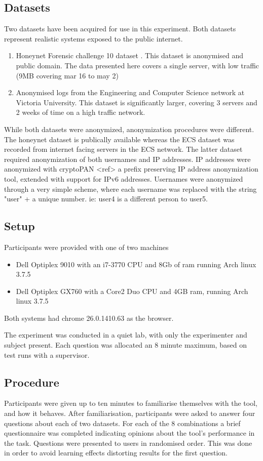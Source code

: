 \subsection{Datasets}\label{data}

Two datasets have been acquired for use in this experiment. Both datasets represent realistic systems exposed to the public internet. 
\begin{enumerate}
\item{Honeynet Forensic challenge 10 dataset \cite{forensic10}. This dataset is anonymised and public domain. The data presented here covers a single server, with low traffic (9MB covering mar 16 to may 2)}
\item{Anonymised logs from the Engineering and Computer Science network at Victoria University. This dataset is significantly larger, covering 3 servers and 2 weeks of time on a high traffic network. }
\end{enumerate}

While both datasets were anonymized, anonymization procedures were different. The honeynet dataset is publically available \cite{forensic10} whereas the ECS dataset was recorded from internet facing servers in the ECS network. The latter dataset required anonymization of both usernames and IP addresses.
IP addresses were anonymized with cryptoPAN <ref> a prefix preserving IP address anonymization tool, extended with support for IPv6 addresses. Usernames were anonymized through a very simple scheme, where each username was replaced with the string "user" + a unique number. ie: user4 is a different person to user5.

\subsection{Setup}
Participants were provided with one of two machines
\begin{itemize}
\item{Dell Optiplex 9010 with an i7-3770 CPU and 8Gb of ram running Arch linux 3.7.5}
\item{Dell Optiplex GX760 with a Core2 Duo CPU and 4GB ram, running Arch linux 3.7.5}
\end{itemize}
Both systems had chrome 26.0.1410.63 as the browser.

The experiment was conducted in a quiet lab, with only the experimenter and subject present. Each question was allocated an 8 minute maximum, based on test runs with a supervisor.

\subsection{Procedure}
Participants were given up to ten minutes to familiarise themselves with the tool, and how it behaves. After familiarisation, participants were asked to answer four questions about each of two datasets. For each of the 8 combinations a brief questionnaire was completed indicating opinions about the tool's performance in the task\cite{lewis1995ibm}.
Questions were presented to users in randomised order. This was done in order to avoid learning effects distorting results for the first question.

